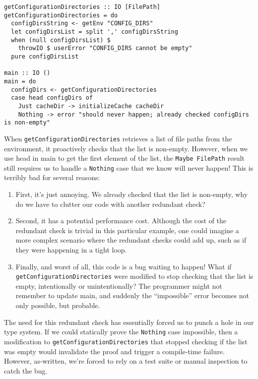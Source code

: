 \begin{verbatim}
getConfigurationDirectories :: IO [FilePath]
getConfigurationDirectories = do
  configDirsString <- getEnv "CONFIG_DIRS"
  let configDirsList = split ',' configDirsString
  when (null configDirsList) $
    throwIO $ userError "CONFIG_DIRS cannot be empty"
  pure configDirsList

main :: IO ()
main = do
  configDirs <- getConfigurationDirectories
  case head configDirs of
    Just cacheDir -> initializeCache cacheDir
    Nothing -> error "should never happen; already checked configDirs is non-empty"
\end{verbatim}
When \texttt{getConfigurationDirectories} retrieves a list of file paths from the environment, it proactively checks that the list is non-empty. However, when we use head in main to get the first element of the list, the \texttt{Maybe FilePath} result still requires us to handle a \texttt{Nothing} case that we know will never happen! This is terribly bad for several reasons:

\begin{enumerate}
\item First, it's just annoying. We already checked that the list is non-empty, why do we have to clutter our code with another redundant check?

\item Second, it has a potential performance cost. Although the cost of the redundant check is trivial in this particular example, one could imagine a more complex scenario where the redundant checks could add up, such as if they were happening in a tight loop.

\item Finally, and worst of all, this code is a bug waiting to happen! What if \texttt{get\-Configuration\-Directories} were modified to stop checking that the list is empty, intentionally or unintentionally? The programmer might not remember to update main, and suddenly the ``impossible'' error becomes not only possible, but probable.                                                                                                                                                                                                                                                                                                                            \end{enumerate}


The need for this redundant check has essentially forced us to punch a hole in our type system. If we could statically prove the \texttt{Nothing} case impossible, then a modification to \texttt{getConfigurationDirectories} that stopped checking if the list was empty would invalidate the proof and trigger a compile-time failure. However, as-written, we're forced to rely on a test suite or manual inspection to catch the bug.

